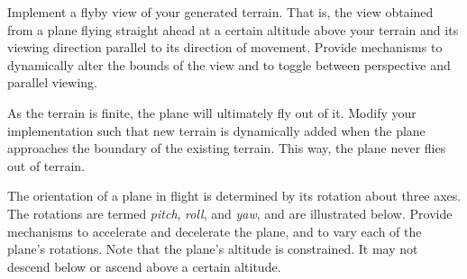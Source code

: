 \documentclass[addpoints]{exam}
\begin{document}
\begin{questions}

  Implement a flyby view of your generated terrain. That is, the view obtained from a plane flying straight ahead at a certain altitude above your terrain and its viewing direction parallel to its direction of movement. Provide mechanisms to dynamically alter the bounds of the view and to toggle between perspective and parallel viewing.


  As the terrain is finite, the plane will ultimately fly out of it. Modify your implementation such that new terrain is dynamically added when the plane approaches the boundary of the existing terrain. This way, the plane never flies out of terrain.


  The orientation of a plane in flight is determined by its rotation about three axes. The rotations are termed \textit{pitch}, \textit{roll}, and \textit{yaw}, and are illustrated below. Provide mechanisms to accelerate and decelerate the plane, and to vary each of the plane's rotations. Note that the plane's altitude is constrained. It may not descend below or ascend above a certain altitude.



\end{questions}
\end{document}
